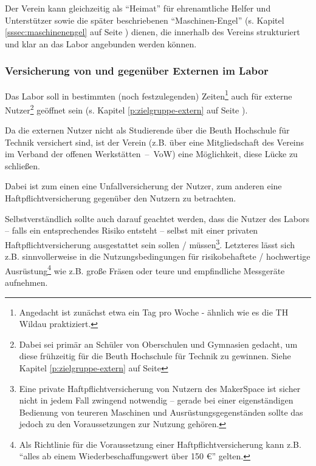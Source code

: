 \documentclass[parskip=half,headsepline,footsepline,titlepage]{scrartcl}
\begin{document}
Der Verein kann gleichzeitig als ``Heimat'' für ehrenamtliche Helfer und Unterstützer sowie die später beschriebenen ``Maschinen-Engel'' (s. Kapitel \ref{sssec:maschinenengel} auf Seite \pageref{sssec:maschinenengel}) dienen, die innerhalb des Vereins strukturiert und klar an das Labor angebunden werden können.


\subsubsection{Versicherung von und gegenüber Externen im Labor}
Das Labor soll in bestimmten (noch festzulegenden) Zeiten\footnote{Angedacht ist zunächst etwa ein Tag pro Woche - ähnlich wie es die TH Wildau praktiziert.} auch für externe Nutzer\footnote{Dabei sei primär an Schüler von Oberschulen und Gymnasien gedacht, um diese frühzeitig für die Beuth Hochschule für Technik zu gewinnen. Siehe Kapitel \ref{p:zielgruppe-extern} auf Seite \pageref{p:zielgruppe-extern}} geöffnet sein (s. Kapitel \ref{p:zielgruppe-extern} auf Seite \pageref{p:zielgruppe-extern}). 

Da die externen Nutzer nicht als Studierende über die Beuth Hochschule für Technik versichert sind, ist der Verein (z.B. über eine Mitgliedschaft des Vereins im Verband der offenen Werkstätten~--~VoW) eine Möglichkeit, diese Lücke zu schließen.

Dabei ist zum einen eine Unfallversicherung der Nutzer, zum anderen eine Haftpflichtversicherung gegenüber den Nutzern zu betrachten.

Selbstverständlich sollte auch darauf geachtet werden, dass die Nutzer des Labors -- falls ein entsprechendes Risiko entsteht -- selbst mit einer privaten Haftpflichtversicherung ausgestattet sein sollen / müssen\footnote{Eine private Haftpflichtversicherung von Nutzern des MakerSpace ist sicher nicht in jedem Fall zwingend notwendig -- gerade bei einer eigenständigen Bedienung von teureren Maschinen und Ausrüstungsgegenständen sollte das jedoch zu den Voraussetzungen zur Nutzung gehören.}. Letzteres lässt sich z.B. sinnvollerweise in die Nutzungsbedingungen für risikobehaftete / hochwertige Ausrüstung\footnote{Als Richtlinie für die Voraussetzung einer Haftpflichtversicherung kann z.B. ``alles ab einem Wiederbeschaffungswert über 150 \euro'' gelten.} wie z.B. große Fräsen oder teure und empfindliche Messgeräte aufnehmen.
\end{document}
